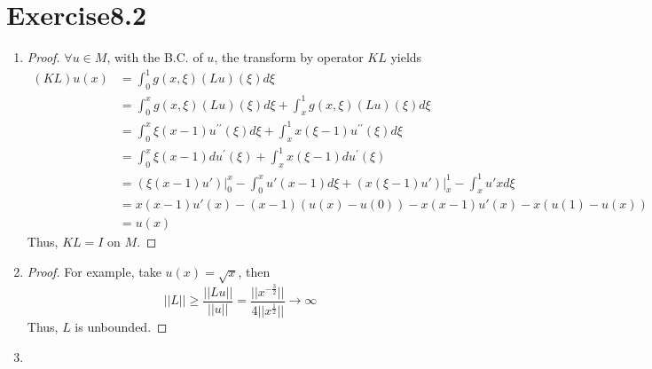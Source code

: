 \documentclass[paper=a4, fontsize=11pt]{scrartcl} %
\numberwithin{equation}{section} %
\numberwithin{figure}{section} %
\numberwithin{table}{section} %
\begin{document}
\section{Exercise8.2}
	\begin{enumerate}
		\item 
			\begin{proof}
				$\forall u \in M$, with the B.C. of $u$, the transform by operator $KL$ yields
				\begin{equation}
					\begin{aligned}
						(KL)u(x) & = \int_{0}^{1} g(x, \xi) (Lu)(\xi) d\xi\\
					 			 & = \int_{0}^{x} g(x, \xi) (Lu)(\xi) d\xi + \int_{x}^{1} g(x, \xi) (Lu)(\xi) d\xi\\
					 			 & = \int_{0}^{x} \xi(x-1) u^{\prime\prime}(\xi) d\xi + \int_{x}^{1} x(\xi - 1) u^{\prime\prime}(\xi) d\xi\\
					 			 & = \int_{0}^{x} \xi(x-1) du^{\prime}(\xi) + \int_{x}^{1} x(\xi - 1) du^{\prime}(\xi)\\
					 			 & = (\xi(x-1)u')\Big|_0^x - \int_{0}^{x} u' (x-1) d\xi + (x(\xi-1)u')\Big|_x^1 - \int_{x}^{1} u' x d\xi\\
					 			 & = x(x-1)u'(x) - (x-1) (u(x) - u(0)) - x(x-1)u'(x) - x (u(1)-u(x))\\
					 			 & = u(x)
					\end{aligned}
				\end{equation}
				Thus, $KL = I$ on $M$.
			\end{proof}
		\item 
			\begin{proof}
				For example, take $u(x) = \sqrt{x}$, then
				\begin{equation}
					||L|| \geq \frac{||Lu||}{||u||} = \frac{||x^{-\frac{3}{2}}||}{4||x^\frac{1}{2}||} \rightarrow \infty
				\end{equation}
				Thus, $L$ is unbounded.
			\end{proof}
		\item 


\end{enumerate}
\end{document}
